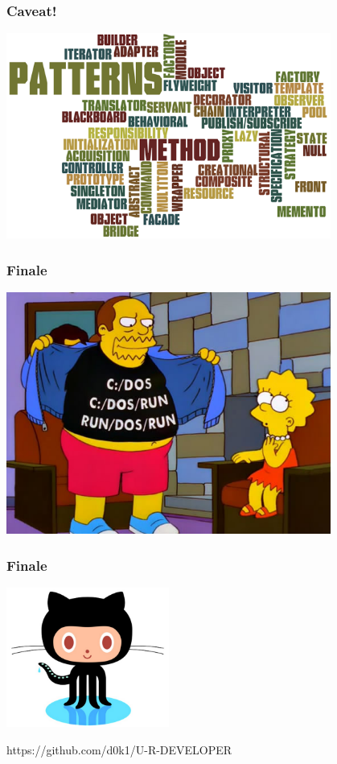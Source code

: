 \documentclass[10pt,pdf,hyperref={unicode}]{beamer}
\begin{document}
\begin{frame}
\frametitle{ Caveat! }
	\center
		\includegraphics[width=0.8\textwidth]{./antipattern.png}
\end {frame}

\begin{frame}
\frametitle{ Finale }

\center
	\includegraphics[width=0.8\textwidth]{./run_dos_run.png}

\end{frame}

\begin{frame}
\frametitle{ Finale }

\center
	\includegraphics[width=0.4\textwidth]{./github.png}

	https://github.com/d0k1/U-R-DEVELOPER

\end{frame}
\end{document}
